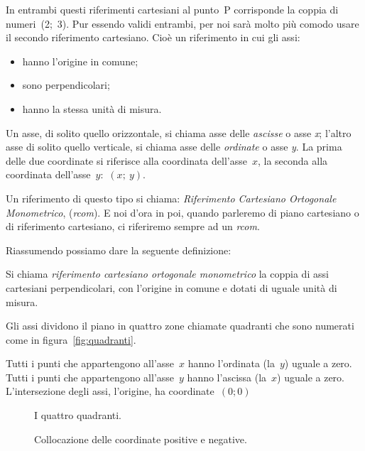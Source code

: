 In entrambi questi riferimenti cartesiani al punto~P corrisponde la coppia
di numeri~(2;~3). Pur essendo validi entrambi, per noi sarà molto più comodo 
usare il secondo riferimento cartesiano. Cioè un riferimento in cui gli assi:

\begin{itemize} [noitemsep]
 \item hanno l'origine in comune;
 \item sono perpendicolari;
 \item hanno la stessa unità di misura.
\end{itemize}

Un asse, di solito quello orizzontale, si chiama asse delle \emph{ascisse} 
o asse \emph{x}; l'altro asse di solito quello verticale, si chiama asse 
delle \emph{ordinate} o asse \emph{y}. La prima delle due coordinate
si riferisce alla coordinata dell'asse~$x$, la seconda alla coordinata 
dell'asse~$y$:~$(x;~y)$.

Un riferimento di questo tipo si chiama: 
\emph{Riferimento Cartesiano Ortogonale Monometrico}, (\emph{rcom}). 
E noi d'ora in poi, quando parleremo di piano cartesiano o di riferimento 
cartesiano, ci riferiremo sempre ad un \emph{rcom}.

Riassumendo possiamo dare la seguente definizione:

\begin{definizione}
Si chiama \emph{riferimento cartesiano ortogonale monometrico} 
la coppia di assi cartesiani perpendicolari, con l'origine in comune e 
dotati di uguale unità di misura.
\end{definizione}

Gli assi dividono il piano in quattro zone chiamate quadranti che sono 
numerati come in figura~\ref{fig:quadranti}.

Tutti i punti che appartengono all'asse~$x$ hanno l'ordinata (la~$y$) uguale 
a zero.
Tutti i punti che appartengono all'asse~$y$ hanno l'ascissa (la~$x$) uguale 
a zero.
L'intersezione degli assi, l'origine, ha coordinate~$(0; 0)$

\begin{inaccessibleblock}
 \begin{figure}[h]
 \centering
 \begin{minipage}[t]{.45\textwidth}
 \centering \pianoconquadranti
 \caption{I quattro quadranti.}\label{fig:quadranti}
 \end{minipage}\hfil
 \begin{minipage}[t]{.45\textwidth}
 \centering \pianoconsegni
 \caption{Collocazione delle coordinate positive e negative.}
 \label{fig:segni}
 \end{minipage}
\end{figure}
\end{inaccessibleblock}

